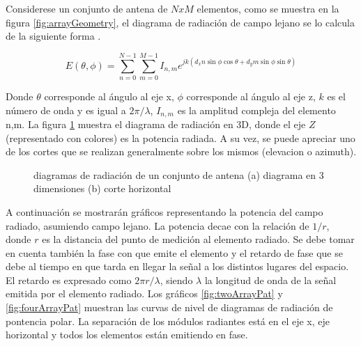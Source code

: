 Considerese un conjunto de antena de $NxM$ elementos, como se muestra en la figura \ref{fig:arrayGeometry}, el diagrama de
radiación de campo lejano se lo calcula de la siguiente forma \cite{Mahafza2004}.

\begin{equation}
	E(\theta, \phi) = \sum_{n=0}^{N-1}\sum_{m=0}^{M-1} I_{n,m} e^{jk(d_xn\sin\phi\cos\theta + d_ym\sin\phi\sin\theta)}
\end{equation}

Donde $\theta$ corresponde al ángulo al eje x, $\phi$ corresponde al ángulo al eje z, $k$ es el número de onda y es igual
a $2\pi/\lambda$, $I_{n,m}$ es la amplitud compleja del elemento n,m. La figura \ref{fig:arrayPattern} muestra el diagrama de
radiación en 3D, donde el eje $Z$ (representado con colores) es la potencia radiada. A su vez, se puede apreciar uno de los
cortes que se realizan generalmente sobre los mismos (elevacion o azimuth).

\begin{figure}[H]
 \centering
	\caption{diagramas de radiación de un conjunto de antena (a) diagrama en 3 dimensiones \cite{arrayPattern} (b) corte horizontal}
 \label{fig:arrayPattern}
\end{figure}

A continuación se mostrarán gráficos representando la potencia del campo radiado, asumiendo campo lejano. La potencia decae
con la relación de $1/r$, donde $r$ es la distancia del punto de medición al elemento radiado. Se debe tomar en cuenta también
la fase con que emite el elemento y el retardo de fase que se debe al tiempo en que tarda en llegar la señal a los distintos
lugares del espacio. El retardo es expresado como $2\pi r/\lambda$, siendo $\lambda$ la longitud de onda de la señal emitida
por el elemento radiado. Los gráficos \ref{fig:twoArrayPat} y \ref{fig:fourArrayPat} muestran las curvas de nivel de diagramas
de radiación de pontencia polar. La separación de los módulos radiantes está en el eje x, eje horizontal y todos los elementos
están emitiendo en fase.

